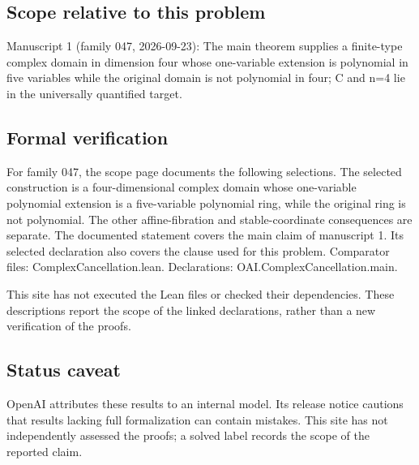 \documentclass[11pt]{article}
\begin{document}
\subsection{Scope relative to this problem}
Manuscript 1 (family 047, 2026-09-23): The main theorem supplies a finite-type complex domain in dimension four whose one-variable extension is polynomial in five variables while the original domain is not polynomial in four; C and n=4 lie in the universally quantified target.

\subsection{Formal verification}
For family 047, the scope page documents the following selections. The selected construction is a four-dimensional complex domain whose one-variable polynomial extension is a five-variable polynomial ring, while the original ring is not polynomial. The other affine-fibration and stable-coordinate consequences are separate. The documented statement covers the main claim of manuscript 1. Its selected declaration also covers the clause used for this problem. Comparator files: ComplexCancellation.lean. Declarations: OAI.ComplexCancellation.main.

This site has not executed the Lean files or checked their dependencies. These descriptions report the scope of the linked declarations, rather than a new verification of the proofs.

\subsection{Status caveat}
OpenAI attributes these results to an internal model. Its release notice cautions that results lacking full formalization can contain mistakes. This site has not independently assessed the proofs; a solved label records the scope of the reported claim.
\end{document}
